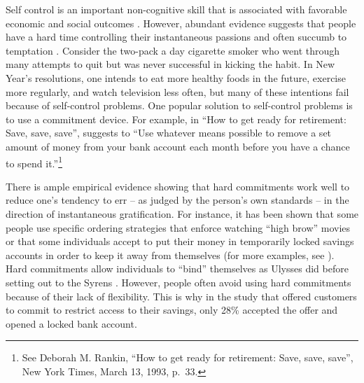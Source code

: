 \documentclass[
]{book}
\begin{document}
Self control is an important non-cognitive skill that is associated with
favorable economic and social outcomes
\citep{laibson1998self, heckman2006effects, alan2015patience}.
However, abundant evidence suggests that people have a hard time controlling
their instantaneous passions and often succumb to temptation \citep{milkman2021film}.
Consider the two-pack a day cigarette smoker who went through many attempts to
quit but was never successful in kicking the habit.
In New Year's resolutions, one intends to eat more healthy foods in the future,
exercise more regularly, and watch television less often, but many of these
intentions fail because of self-control problems.
One popular solution to self-control problems is to use a commitment device.
For example, in ``How to get ready for retirement: Save, save, save'',
\citet{rankin1993get} suggests to ``Use whatever means possible to remove a set amount
of money from your bank account each month before you have a chance to spend
it.''\footnote{See Deborah M. Rankin, ``How to get ready for retirement: Save, save,
  save'', New York Times, March 13, 1993, p.~33.}

There is ample empirical evidence showing that hard commitments work well to
reduce one's tendency to err -- as judged by the person's own standards -- in
the direction of instantaneous gratification.
For instance, it has been shown that some people use specific ordering
strategies that enforce watching ``high brow'' movies \citep{read1999mixing}
or that some individuals accept to put their money in temporarily locked savings accounts in order to keep it away from themselves (for more examples, see \citet{milkman2021film}).
Hard commitments allow individuals to ``bind'' themselves as Ulysses did before
setting out to the Syrens \citep{elster2000ulysses}.
However, people often avoid using hard commitments because of their lack of
flexibility.
This is why in the \citet{ashraf2006tying} study that offered customers to commit to
restrict access to their savings, only 28\% accepted the offer and opened a
locked bank account.
\end{document}
